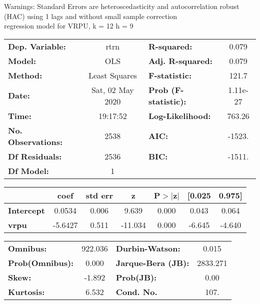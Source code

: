 Warnings: \newline
 [1] Standard Errors are heteroscedasticity and autocorrelation robust (HAC) using 1 lags and without small sample correction\\ 

regression model for VRPU, k = 12 h = 9\begin{center}
\begin{tabular}{lclc}
\toprule
\textbf{Dep. Variable:}    &       rtrn       & \textbf{  R-squared:         } &     0.079   \\
\textbf{Model:}            &       OLS        & \textbf{  Adj. R-squared:    } &     0.079   \\
\textbf{Method:}           &  Least Squares   & \textbf{  F-statistic:       } &     121.7   \\
\textbf{Date:}             & Sat, 02 May 2020 & \textbf{  Prob (F-statistic):} &  1.11e-27   \\
\textbf{Time:}             &     19:17:52     & \textbf{  Log-Likelihood:    } &    763.26   \\
\textbf{No. Observations:} &        2538      & \textbf{  AIC:               } &    -1523.   \\
\textbf{Df Residuals:}     &        2536      & \textbf{  BIC:               } &    -1511.   \\
\textbf{Df Model:}         &           1      & \textbf{                     } &             \\
\bottomrule
\end{tabular}
\begin{tabular}{lcccccc}
                   & \textbf{coef} & \textbf{std err} & \textbf{z} & \textbf{P$> |$z$|$} & \textbf{[0.025} & \textbf{0.975]}  \\
\midrule
\textbf{Intercept} &       0.0534  &        0.006     &     9.639  &         0.000        &        0.043    &        0.064     \\
\textbf{vrpu}      &      -5.6427  &        0.511     &   -11.034  &         0.000        &       -6.645    &       -4.640     \\
\bottomrule
\end{tabular}
\begin{tabular}{lclc}
\textbf{Omnibus:}       & 922.036 & \textbf{  Durbin-Watson:     } &    0.015  \\
\textbf{Prob(Omnibus):} &   0.000 & \textbf{  Jarque-Bera (JB):  } & 2833.271  \\
\textbf{Skew:}          &  -1.892 & \textbf{  Prob(JB):          } &     0.00  \\
\textbf{Kurtosis:}      &   6.532 & \textbf{  Cond. No.          } &     107.  \\
\bottomrule
\end{tabular}
\end{center}


